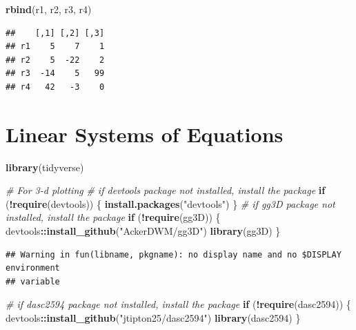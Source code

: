 \documentclass[
]{book}
\newenvironment{Shaded}{\begin{snugshade}}{\end{snugshade}}
\newcommand{\CommentTok}[1]{\textcolor[rgb]{0.56,0.35,0.01}{\textit{#1}}}
\newcommand{\ControlFlowTok}[1]{\textcolor[rgb]{0.13,0.29,0.53}{\textbf{#1}}}
\newcommand{\KeywordTok}[1]{\textcolor[rgb]{0.13,0.29,0.53}{\textbf{#1}}}
\newcommand{\NormalTok}[1]{#1}
\newcommand{\OperatorTok}[1]{\textcolor[rgb]{0.81,0.36,0.00}{\textbf{#1}}}
\newcommand{\StringTok}[1]{\textcolor[rgb]{0.31,0.60,0.02}{#1}}
\theoremstyle{definition}
\theoremstyle{definition}
\theoremstyle{definition}
\theoremstyle{definition}
\theoremstyle{remark}
\begin{document}
\begin{Shaded}
\begin{Highlighting}[]
\KeywordTok{rbind}\NormalTok{(r1, r2, r3, r4)}
\end{Highlighting}
\end{Shaded}

\begin{verbatim}
##    [,1] [,2] [,3]
## r1    5    7    1
## r2    5  -22    2
## r3  -14    5   99
## r4   42   -3    0
\end{verbatim}

\hypertarget{linear-systems-of-equations}{%
\chapter{Linear Systems of Equations}\label{linear-systems-of-equations}}

\begin{Shaded}
\begin{Highlighting}[]
\KeywordTok{library}\NormalTok{(tidyverse)}

\CommentTok{# For 3-d plotting}
\CommentTok{# if devtools package not installed, install the package}
\ControlFlowTok{if}\NormalTok{ (}\OperatorTok{!}\KeywordTok{require}\NormalTok{(devtools)) \{}
    \KeywordTok{install.packages}\NormalTok{(}\StringTok{"devtools"}\NormalTok{)}
\NormalTok{\}}
\CommentTok{# if gg3D package not installed, install the package}
\ControlFlowTok{if}\NormalTok{ (}\OperatorTok{!}\KeywordTok{require}\NormalTok{(gg3D)) \{}
\NormalTok{    devtools}\OperatorTok{::}\KeywordTok{install_github}\NormalTok{(}\StringTok{"AckerDWM/gg3D"}\NormalTok{)}
    \KeywordTok{library}\NormalTok{(gg3D)}
\NormalTok{\}}
\end{Highlighting}
\end{Shaded}

\begin{verbatim}
## Warning in fun(libname, pkgname): no display name and no $DISPLAY environment
## variable
\end{verbatim}

\begin{Shaded}
\begin{Highlighting}[]
\CommentTok{# if dasc2594 package not installed, install the package}
\ControlFlowTok{if}\NormalTok{ (}\OperatorTok{!}\KeywordTok{require}\NormalTok{(dasc2594)) \{}
\NormalTok{    devtools}\OperatorTok{::}\KeywordTok{install_github}\NormalTok{(}\StringTok{"jtipton25/dasc2594"}\NormalTok{)}
    \KeywordTok{library}\NormalTok{(dasc2594)}
\NormalTok{\}}
\end{Highlighting}
\end{Shaded}
\end{document}
